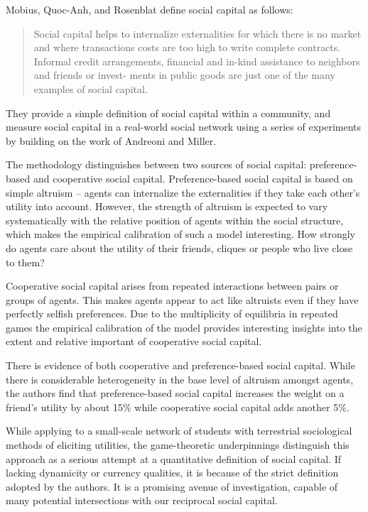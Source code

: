 \documentclass[10pt,oneside]{memoir}
\begin{document}
\begin{Spacing}{2}
Mobius, Quoc-Anh, and Rosenblat \cite{Mobius:2004:Capital} define social capital as follows:


\begin{quote}
Social capital helps to internalize externalities for which there is no market and where transactions costs are too high to write complete contracts. Informal credit arrangements, financial and in-kind assistance to neighbors and friends or invest- ments in public goods are just one of the many examples of social capital.
\end{quote}


They provide a simple definition of social capital within a community, and measure social capital in a real-world social network using a series of experiments by building on the work of Andreoni and Miller.


The methodology distinguishes between two sources of social capital: preference- based and cooperative social capital. Preference-based social capital is based on simple altruism -- agents can internalize the externalities if they take each other's utility into account. However, the strength of altruism is expected to vary systematically with the relative position of agents within the social structure,  which makes the empirical calibration of such a model interesting. How strongly do agents care about the utility of their friends, cliques or people who live close to them?


Cooperative social capital arises from repeated interactions between pairs or groups of agents. This makes agents appear to act like altruists even if they have perfectly selfish preferences. Due to the multiplicity of equilibria in repeated games the empirical calibration of the model provides interesting insights into the extent and relative important of cooperative social capital.


There is evidence of both cooperative and preference-based social capital. While there is considerable heterogeneity in the base level of altruism amongst agents, the authors find that preference-based social capital increases the weight on a friend's utility by about 15\% while cooperative social capital adds another 5\%.


While applying to a small-scale network of students with terrestrial sociological methods of eliciting utilities, the game-theoretic underpinnings distinguish this approach as a serious attempt at a quantitative definition of social capital.  If lacking dynamicity or currency qualities, it is because of the strict definition adopted by the authors.  It is a promising avenue of investigation, capable of many potential intersections with our reciprocal social capital.



\end{Spacing}
\end{document}
